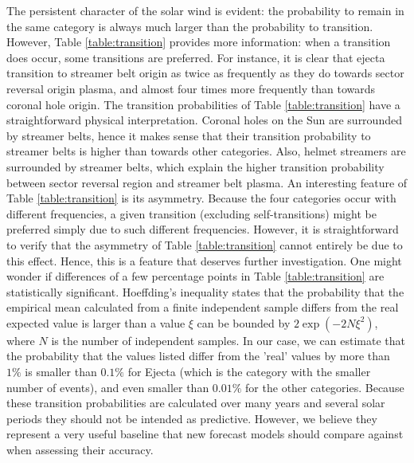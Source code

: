 \documentclass[draft,jgrga]{agutex}
\begin{document}
\begin{article}
The persistent character of the solar wind is evident: the probability to remain in the same category is always much larger than the probability to transition. However, Table \ref{table:transition} provides more information: when a transition does occur, some transitions are preferred. For instance, it is clear that ejecta transition to streamer belt origin as twice as frequently as they do towards sector reversal origin plasma, and almost four times more frequently than towards coronal hole origin. The transition probabilities of Table \ref{table:transition} have a straightforward physical interpretation. Coronal holes on the Sun are surrounded by streamer belts, hence it makes sense that their transition probability to streamer belts is higher than towards other categories. Also, helmet streamers are surrounded by streamer belts, which explain the higher transition probability between sector reversal region and streamer belt plasma. 
An interesting feature of Table \ref{table:transition} is its asymmetry. {Because the four categories occur with different frequencies, a given transition (excluding self-transitions) might be preferred simply due to such different frequencies}. However, it is straightforward to verify that the asymmetry of Table \ref{table:transition} cannot entirely be due to this effect. Hence, this is a feature that deserves further investigation.
One might wonder if differences of a few percentage points in Table \ref{table:transition} are statistically significant. Hoeffding's inequality \citep{hoeffding63} states that the probability that the empirical mean calculated from a finite independent sample differs from the real expected value is larger than a value $\xi$ can be bounded by $2\exp(-2N\xi^2)$, where $N$ is the {number of independent samples}. In our case, we can estimate that the probability that the values listed differ from the 'real' values by more than $1\%$ is smaller than $0.1\%$ for Ejecta (which is the category with the smaller number of events), and even smaller than $0.01\%$ for the other categories.
Because these transition probabilities are calculated over many years and several solar periods they should not be intended as predictive. However, we believe they represent a very useful baseline that new forecast models should compare against when assessing their accuracy.


\end{article}
\end{document}
